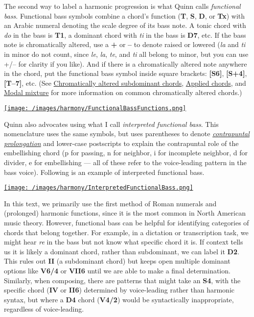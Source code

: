 \documentclass{book}
\begin{document}
The second way to label a harmonic progression is what Quinn calls
\emph{functional bass}. Functional bass symbols combine a chord's function
(\textbf{T}, \textbf{S}, \textbf{D}, or \textbf{Tx}) with an Arabic numeral
denoting the scale degree of its bass note. A tonic chord with \emph{do} in
the bass is \textbf{T1}, a dominant chord with \emph{ti} in the bass is
\textbf{D7}, etc. If the bass note is chromatically altered, use a \textbf{+}
or \textbf{--} to denote raised or lowered (\emph{la} and \emph{ti} in minor
do not count, since \emph{le}, \emph{la}, \emph{te}, and \emph{ti} all belong
to minor, but you can use +/-- for clarity if you like). And if there is a
chromatically altered note anywhere in the chord, put the functional bass
symbol inside square brackets: \textbf{{[}S6{]}}, \textbf{{[}S+4{]}},
\textbf{{[}T--7{]}}, etc. (See \href{alteredSubdominants.html}{Chromatically
altered subdominant chords}, \href{appliedChords.html}{Applied chords}, and
\href{modalMixture.html}{Modal mixture} for more information on common
chromatically altered chords.)

\href{/images/harmony/FunctionalBassFunctions.png}{\texttt{[image: /images/harmony/FunctionalBassFunctions.png]}}

Quinn also advocates using what I call \emph{interpreted functional bass}.
This nomenclature uses the same symbols, but uses parentheses to denote
\href{http://openmusictheory.com/harmonicSyntax2.html}{\emph{contrapuntal
prolongation}} and lower-case postscripts to explain the contrapuntal role of
the embellishing chord (p for passing, n for neighbor, i for incomplete
neighbor, d for divider, e for embellishing --- all of these refer to the
voice-leading pattern in the bass voice). Following is an example of
interpreted functional bass.

\href{/images/harmony/InterpretedFunctionalBass.png}{\texttt{[image: /images/harmony/InterpretedFunctionalBass.png]}}

In this text, we primarily use the first method of Roman numerals and
(prolonged) harmonic functions, since it is the most common in North American
music theory. However, functional bass can be helpful for identifying
categories of chords that belong together. For example, in a dictation or
transcription task, we might hear \emph{re} in the bass but not know what
specific chord it is. If context tells us it is likely a dominant chord,
rather than subdominant, we can label it \textbf{D2}. This rules out
\textbf{II} (a subdominant chord) but keeps open multiple dominant options
like \textbf{V6/4} or \textbf{VII6} until we are able to make a final
determination. Similarly, when composing, there are patterns that might take
an \textbf{S4}, with the specific chord (\textbf{IV} or \textbf{II6})
determined by voice-leading rather than harmonic syntax, but where a
\textbf{D4} chord (\textbf{V4/2}) would be syntactically inappropriate,
regardless of voice-leading.
\end{document}
